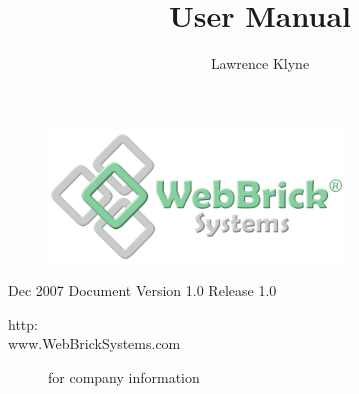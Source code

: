 \documentclass[a4paper,12pt]{article}
\title{\sf{WebBrick Gateway TouchScreen}\linebreak \linebreak User Manual}
\author{Lawrence Klyne}
\begin{document}
\maketitle

\begin{figure}[H]
\centering
\includegraphics[width=0.7\textwidth]{../../Images/WebBrickSystems.png}
\end{figure}


\begin{description}
\item[Dec 2007 Document Version 1.0 Release 1.0]
\end{description}

\begin{description}
\item[http:\\www.WebBrickSystems.com] for company information
\end{description}

\pagebreak

\tableofcontents

\pagebreak




\end{document}

